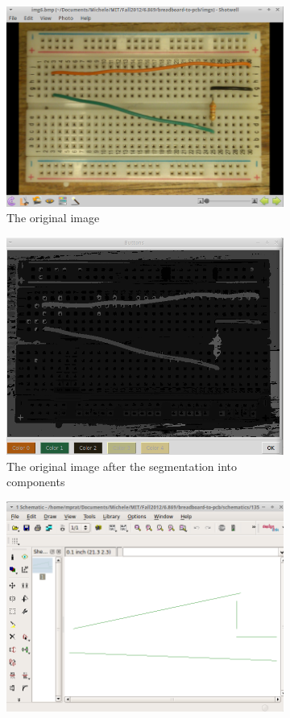 \documentclass[10pt,twocolumn,letterpaper]{article}
\begin{document}
\begin{figure}[ht]
\centering
\begin{subfigure}[b]{\linewidth}
	\centering
   \includegraphics[width=0.9\linewidth]{demos/full_pipeline2_original.png}
	\caption{The original image}
	\label{fig:origfull}
\end{subfigure}
\begin{subfigure}[b]{\linewidth}
	\centering
   \includegraphics[width=0.9\linewidth]{demos/full_pipeline2_segmentation.png}
	\caption{The original image after the segmentation into components}
	\label{fig:segfull}
\end{subfigure}
\begin{subfigure}[b]{\linewidth}
	\centering
   \includegraphics[width=0.9\linewidth]{demos/full_pipeline2_schematic.png}

\end{subfigure}
\end{figure}
\end{document}
